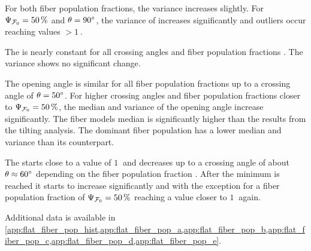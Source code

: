 For both fiber population fractions, the variance increases slightly.
For $\textnormal{$\Psi_{\textnormal{$\mathcal{F}_0$}}$} = \SI{50}{\percent}$ and $\textnormal{$\theta$} = \SI{90}{\degree}$, the variance of \trel{} increases significantly and outliers occur reaching \trel{} values $>\SI{1}{}$.
\par
The \rvalue{} is nearly constant for all crossing angles \modelOmega{} and fiber population fractions \modelPsi{}. The variance shows no significant change.
\par
The opening angle \openingAngle{} is similar for all fiber population fractions up to a crossing angle of $\textnormal{$\theta$}=\SI{50}{\degree}$.
For higher crossing angles and fiber population fractions closer to $\textnormal{$\Psi_{\textnormal{$\mathcal{F}_0$}}$} = \SI{50}{\percent}$, the median and variance of the opening angle increase significantly.
The fiber models median \openingAngle{} is significantly higher than the results from the tilting analysis.
The dominant fiber population has a lower median and \bvariance{} variance than its counterpart.
\par
The \accvalue{} starts close to a value of $\SI{1}{}$ and decreases up to a crossing angle of about $\textnormal{$\theta$} \approx \SI{60}{\degree}$ depending on the fiber population fraction \modelPsi{}.
After the minimum is reached it starts to increase significantly and with the exception for a fiber population fraction of $\textnormal{$\Psi_{\textnormal{$\mathcal{F}_0$}}$}=\SI{50}{\percent}$ reaching a value closer to $\SI{1}{}$ again.
\par
% 
Additional data is available in \cref{app:flat_fiber_pop_hist,app:flat_fiber_pop_a,app:flat_fiber_pop_b,app:flat_fiber_pop_c,app:flat_fiber_pop_d,app:flat_fiber_pop_e}.
%
%
%
